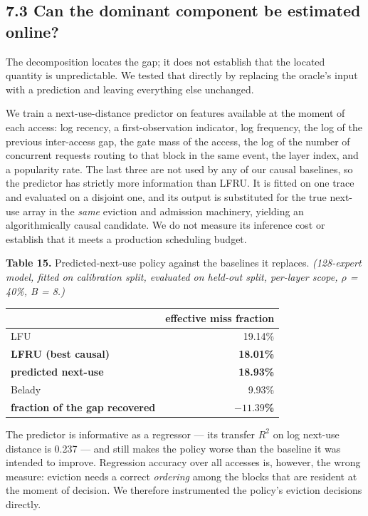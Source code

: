 \documentclass[
  10pt,
  letterpaper,
  10pt]{article}
\newcounter{none} %
\begin{document}
\subsection{7.3 Can the dominant component be estimated
online?}\label{can-the-dominant-component-be-estimated-online}

The decomposition locates the gap; it does not establish that the
located quantity is unpredictable. We tested that directly by replacing
the oracle's input with a prediction and leaving everything else
unchanged.

We train a next-use-distance predictor on features available at the
moment of each access: log recency, a first-observation indicator, log
frequency, the log of the previous inter-access gap, the gate mass of
the access, the log of the number of concurrent requests routing to that
block in the same event, the layer index, and a popularity rate. The
last three are not used by any of our causal baselines, so the predictor
has strictly more information than LFRU. It is fitted on one trace and
evaluated on a disjoint one, and its output is substituted for the true
next-use array in the \emph{same} eviction and admission machinery,
yielding an algorithmically causal candidate. We do not measure its
inference cost or establish that it meets a production scheduling
budget.

\textbf{Table 15.} Predicted-next-use policy against the baselines it
replaces. \emph{(128-expert model, fitted on calibration split,
evaluated on held-out split, per-layer scope, \(\rho\) = 40\%, B = 8.)}

{\def\LTcaptype{none} %
\begin{longtable}[]{@{}lr@{}}
\toprule\noalign{}
& effective miss fraction \\
\midrule\noalign{}
\endhead
\bottomrule\noalign{}
\endlastfoot
LFU & 19.14\% \\
\textbf{LFRU (best causal)} & \textbf{18.01\%} \\
\textbf{predicted next-use} & \textbf{18.93\%} \\
Belady & 9.93\% \\
\textbf{fraction of the gap recovered} & \textbf{\(-11.39\)\%} \\
\end{longtable}
}

The predictor is informative as a regressor --- its transfer \(R^2\) on
log next-use distance is 0.237 --- and still makes the policy worse than
the baseline it was intended to improve. Regression accuracy over all
accesses is, however, the wrong measure: eviction needs a correct
\emph{ordering} among the blocks that are resident at the moment of
decision. We therefore instrumented the policy's eviction decisions
directly.
\end{document}
